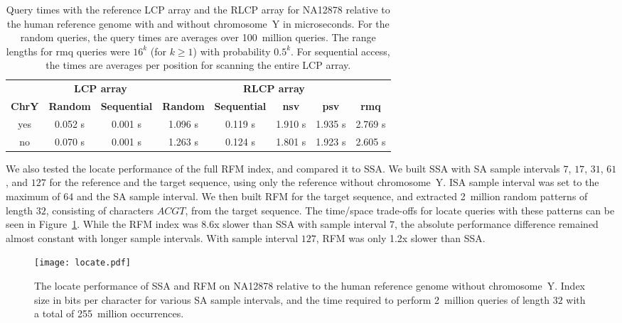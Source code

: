 \documentclass[a4paper,11pt]{llncs}
\newcommand{\SA}{\textsf{SA}}
\newcommand{\ISA}{\textsf{ISA}}
\newcommand{\SSA}{\textsf{SSA}}
\newcommand{\RFM}{\textsf{RFM}}
\newcommand{\LCP}{\textsf{LCP}}
\newcommand{\RLCP}{\textsf{RLCP}}
\newcommand{\locate}{\textsf{locate}}
\newcommand{\nsv}{\textsf{nsv}}
\newcommand{\psv}{\textsf{psv}}
\newcommand{\rmq}{\textsf{rmq}}
\newcommand{\mus}{\textmu{}s}
\begin{document}
\begin{table}
\caption{Query times with the reference \LCP{} array and the \RLCP{} array for
NA12878 relative to the human reference genome with and without chromosome~Y
in microseconds. For the random queries, the query times are averages over
100~million queries. The range lengths for \rmq{} queries were $16^{k}$ (for
$k \ge 1$) with probability $0.5^{k}$. For sequential access, the times are
averages per position for scanning the entire \LCP{} array.}\label{table:rlcp
queries}
\setlength{\extrarowheight}{2pt}
\setlength{\tabcolsep}{3pt}
\begin{center}
\begin{tabular}{c|cc|ccccc}
\hline
 & \multicolumn{2}{c|}{\textbf{\LCP{} array}} &
\multicolumn{5}{c}{\textbf{\RLCP{} array}} \\
\textbf{ChrY} & \textbf{Random} & \textbf{Sequential} & \textbf{Random} &
\textbf{Sequential} & \textbf{\nsv} & \textbf{\psv} & \textbf{\rmq} \\
\hline
yes & 0.052 \mus & 0.001 \mus & 1.096 \mus & 0.119 \mus & 1.910 \mus & 1.935
\mus & 2.769 \mus \\
no  & 0.070 \mus & 0.001 \mus & 1.263 \mus & 0.124 \mus & 1.801 \mus & 1.923
\mus & 2.605 \mus \\
\hline
\end{tabular}
\end{center}
\end{table}

We also tested the \locate{} performance of the full \RFM{} index, and
compared it to \SSA. We built \SSA{} with \SA{} sample intervals $7$, $17$,
$31$, $61$, and $127$ for the reference and the target sequence, using only
the reference without chromosome~Y. \ISA{} sample interval was set to the
maximum of $64$ and the \SA{} sample interval. We then built \RFM{} for the
target sequence, and extracted 2~million random patterns of length $32$,
consisting of characters $ACGT$, from the target sequence. The time/space
trade-offs for \locate{} queries with these patterns can be seen in
Figure~\ref{fig:locate}. While the \RFM{} index was 8.6x slower than \SSA{}
with sample interval $7$, the absolute performance difference remained almost
constant with longer sample intervals. With sample interval $127$, \RFM{} was
only 1.2x slower than \SSA.

\begin{figure}
\begin{center}
\texttt{[image: locate.pdf]}
\end{center}
\caption{The \locate{} performance of \SSA{} and \RFM{} on NA12878 relative to
the human reference genome without chromosome~Y. Index size in bits per
character for various \SA{} sample intervals, and the time required to perform
2~million queries of length $32$ with a total of 255~million
occurrences.}\label{fig:locate}
\end{figure}
\end{document}
